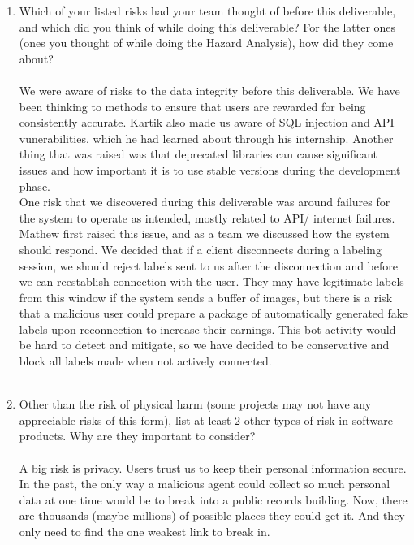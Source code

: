 \documentclass{article}
\begin{document}
\begin{enumerate}
    \\\\
    \item Which of your listed risks had your team thought of before this
    deliverable, and which did you think of while doing this deliverable? For
    the latter ones (ones you thought of while doing the Hazard Analysis), how
    did they come about?\\\\
    We were aware of risks to the data integrity before this deliverable. We have been thinking to methods to ensure that users are rewarded for being consistently accurate. Kartik also 
    made us aware of SQL injection and API vunerabilities, which he had learned about through his internship. Another thing that was raised was that deprecated libraries can cause significant 
    issues and how important it is to use stable versions during the development phase.\\
    One risk that we discovered during this deliverable was around failures for the system to operate as intended, mostly related to API/ internet failures. Mathew first raised this issue, and
    as a team we discussed how the system should respond. We decided that if a client disconnects during a labeling session, we should reject labels sent to us after the disconnection and before
    we can reestablish connection with the user. They may have legitimate labels from this window if the system sends a buffer of images, but there is a risk that a malicious user could prepare 
    a package of automatically generated fake labels upon reconnection to increase their earnings. This bot activity would be hard to detect and mitigate, so we have decided to be conservative and block all labels
    made when not actively connected.
    \\\\
    \item Other than the risk of physical harm (some projects may not have any
    appreciable risks of this form), list at least 2 other types of risk in
    software products. Why are they important to consider?\\\\
    A big risk is privacy. Users trust us to keep their personal information secure. In the past, the only way a malicious agent could collect so much personal data at one time 
    would be to break into a public records building. Now, there are thousands (maybe millions) of possible places they could get it. And they only need to find the one weakest link to break in. 

\end{enumerate}
\end{document}
